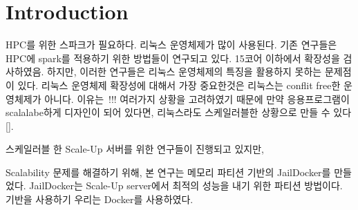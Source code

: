 \section{Introduction} \label{sec:introduction}
\ifkor
HPC를 위한 스파크가 필요하다. 
리눅스 운영체제가 많이 사용된다. 
기존 연구들은 HPC에 spark를 적용하기 위한 방법들이 연구되고 있다.
15코어 이하에서 확장성을 검사하였음.
하지만, 이러한 연구들은 리눅스 운영체제의 특징을 활용하지 못하는 문제점이 있다.
리눅스 운영체제 확장성에 대해서 가장 중요한것은 
리눅스는 conflit free한 운영체제가 아니다.
이유는~!!! 여러가지 상황을 고려하였기 때문에 
만약 응용프로그램이 scalalabe하게 디자인이 되어 있다면, 리눅스라도 스케일러블한 
상황으로 만들 수 있다[]. 
\else

\fi

\ifkor
스케일러블 한 Scale-Up 서버를 위한 연구들이 진행되고 있지만, 




\else


\fi



\ifkor
Scalability 문제를 해결하기 위해, 본 연구는 메모리 파티션 기반의 JailDocker를 만들었다. 
JailDocker는 Scale-Up server에서 최적의 성능을 내기 위한 파티션 방법이다. 
기반을 사용하기 우리는 Docker를 사용하였다. 

\else


\fi




\ifkor


\else

\fi


